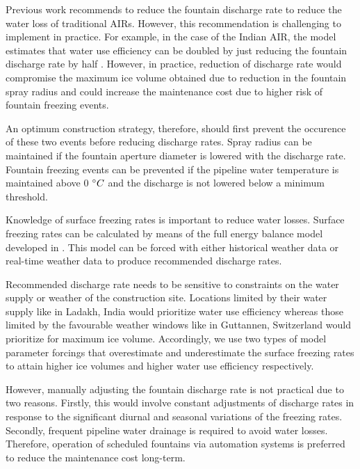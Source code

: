 \documentclass[tc, manuscript]{copernicus}
\begin{document}
Previous work \citep{balasubramanianInfluenceMeteorologicalConditions2022} recommends to reduce the fountain
discharge rate to reduce the water loss of traditional AIRs. However, this recommendation is challenging to
implement in practice. For example, in the case of the Indian AIR, the model estimates that water use efficiency
can be doubled by just reducing the fountain discharge rate by half
\citep{balasubramanianInfluenceMeteorologicalConditions2022}. However, in practice, reduction of discharge rate
would compromise the maximum ice volume obtained due to reduction in the fountain spray radius and could
increase the maintenance cost due to higher risk of fountain freezing events.  

An optimum construction strategy, therefore, should first prevent the occurence of these two events before
reducing discharge rates. Spray radius can be maintained if the fountain aperture diameter is lowered with the
discharge rate. Fountain freezing events can be prevented if the pipeline water temperature is maintained above
0 $^{\circ} C$ and the discharge is not lowered below a minimum threshold. 

Knowledge of surface freezing rates is important to reduce water losses. Surface freezing rates can be
calculated by means of the full energy balance model developed in
\cite{balasubramanianInfluenceMeteorologicalConditions2022}. This model can be forced with either historical
weather data or real-time weather data to produce recommended discharge rates.

Recommended discharge rate needs to be sensitive to constraints on the water supply or weather of the
construction site. Locations limited by their water supply like in Ladakh, India would prioritize water use
efficiency whereas those limited by the favourable weather windows like in Guttannen, Switzerland  would
prioritize for maximum ice volume.  Accordingly, we use two types of model parameter forcings that overestimate
and underestimate the surface freezing rates to attain higher ice volumes and higher water use efficiency
respectively. 

However, manually adjusting the fountain discharge rate is not practical due to two reasons. Firstly, this would
involve constant adjustments of discharge rates in response to the significant diurnal and seasonal variations
of the freezing rates. Secondly, frequent pipeline water drainage is required to avoid water losses. Therefore,
operation of scheduled fountains via automation systems is preferred to reduce the maintenance cost long-term.
\end{document}

